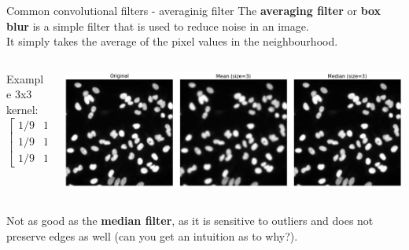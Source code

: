 \documentclass[9pt, aspectratio=169]{beamer}
\begin{document}
\begin{frame}
    {Common convolutional filters - averaginig filter}
    The \textbf{averaging filter} or \textbf{box blur} is a simple filter that is used to reduce noise in an image.\\

    It simply takes the average of the pixel values in the neighbourhood.

    \begin{columns}
        \begin{column}{.25\textwidth}
            \centering
            Example 3x3 kernel:\\
            $$\begin{bmatrix}1/9&1/9&1/9\\1/9&1/9&1/9\\1/9&1/9&1/9\end{bmatrix}$$
        \end{column}
        \begin{column}{.75\textwidth}
            \includegraphics[width=\textwidth]{mean_vs_median.png}
        \end{column}
    \end{columns}

    Not as good as the \textbf{median filter}, as it is sensitive to outliers and does not preserve edges as well (can you get an intuition as to why?).

\end{frame}
\end{document}
